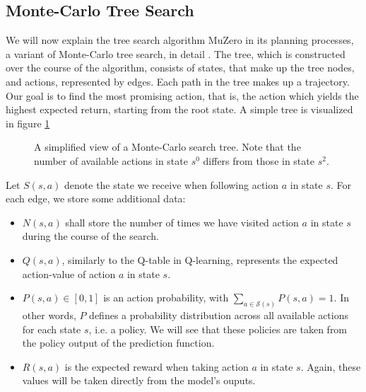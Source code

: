 \newcommand{\argmax}{\operatornamewithlimits{argmax}}

\subsection{Monte-Carlo Tree Search}
We will now explain the tree search algorithm MuZero in its planning processes, a variant of Monte-Carlo tree search, in detail \cite{alphazero, muzero}. The tree, which is constructed over the course of the algorithm, consists of states, that make up the tree nodes, and actions, represented by edges. Each path in the tree makes up a trajectory. Our goal is to find the most promising action, that is, the action which yields the highest expected return, starting from the root state. A simple tree is visualized in figure \ref{fig:mcts_simple}
\begin{figure}[ht]
    \centering
    \caption{A simplified view of a Monte-Carlo search tree. Note that the number of available actions in state $s^0$ differs from those in state $s^2$.}
    \label{fig:mcts_simple}
\end{figure}

Let $S(s, a)$ denote the state we receive when following action $a$ in state $s$. For each edge, we store some additional data:
\begin{itemize}
    \item $N(s, a)$ shall store the number of times we have visited action $a$ in state $s$ during the course of the search.
    \item $Q(s, a)$, similarly to the Q-table in Q-learning, represents the expected action-value of action $a$ in state $s$.
    \item $P(s, a) \in [0, 1]$ is an action probability, with $\sum_{a \in \mathscr{S}(s)} P(s, a) = 1$. In other words, $P$ defines a probability distribution across all available actions for each state $s$, i.e. a policy. We will see that these policies are taken from the policy output of the prediction function.
    \item $R(s, a)$ is the expected reward when taking action $a$ in state $s$. Again, these values will be taken directly from the model's ouputs.
\end{itemize}


